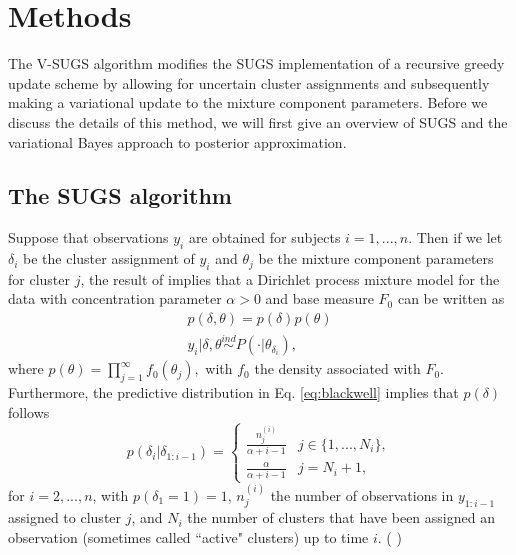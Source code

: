 \documentclass{uwstat572}
\newcommand{\vmcomment}[1]{({\color{blue}{VM's comment:}} \textbf{\color{blue}{#1}})}
\begin{document}
\section{Methods}

The V-SUGS algorithm modifies the SUGS implementation of a recursive greedy update scheme by allowing for uncertain cluster assignments and subsequently making a variational update to the mixture component parameters. Before we discuss the details of this method, we will first give an overview of SUGS and the variational Bayes approach to posterior approximation.

\subsection{The SUGS algorithm}

Suppose that observations $y_i$ are obtained for subjects $i = 1,..., n$. Then if we let $\delta_i$ be the cluster assignment of $y_i$ and $\theta_j$ be the mixture component parameters for cluster $j$, the result of \cite{lo} implies that a Dirichlet process mixture model for the data with concentration parameter $\alpha >  0$ and base measure $F_0$ can be written as 
\begin{align}
p(\delta,\theta) = p(\delta)p(\theta) \nonumber \\
y_i | \delta, \theta \overset{ind}{\sim} P(\cdot | \theta_{\delta_i}), \nonumber
\end{align}
where $ p(\theta) = \prod_{j=1}^\infty f_0(\theta_j),$ with $f_0$ the density associated with $F_0$. Furthermore, the predictive distribution in Eq. \ref{eq:blackwell} implies that $p(\delta)$ follows 
\[ p(\delta_i | \delta_{1:i-1}) = \begin{cases} 
      \frac{n_j^{(i)}}{\alpha+i-1}& j \in \{1,...,N_i\}, \\
      \frac{\alpha}{\alpha+i-1} & j = N_i +1,
   \end{cases}
\]
for $i = 2,...,n$, with $p(\delta_1 = 1) = 1$, $n_j^{(i)}$ the number of observations in $y_{1:i-1}$ assigned to cluster $j$, and $N_i$ the number of clusters that have been assigned an observation (sometimes called ``active" clusters) up to time $i$.
\vmcomment{Matrices and vectors should be bolded.}
\end{document}
